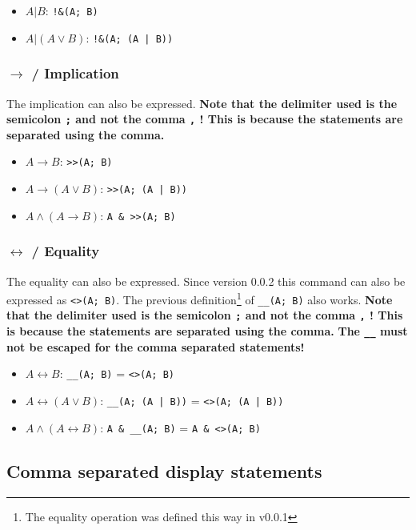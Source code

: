 \documentclass[a4paper]{article}
\begin{document}
\begin{itemize}
	\item $A | B$:  \texttt{!\&(A; B)}
	\item $A | (A \lor B)$: \texttt{!\&(A; (A | B))}
\end{itemize}

\subsubsection{$\rightarrow$ / Implication}

The implication can also be expressed. \textbf{Note that the delimiter used is the semicolon \texttt{;} and not the comma \texttt{,} ! This is because the statements are separated using the comma.}

\begin{itemize}
	\item $A \rightarrow B$:  \texttt{>>(A; B)}
	\item $A \rightarrow (A \lor B)$: \texttt{>>(A; (A | B))}
	\item $A \land (A \rightarrow B)$: \texttt{A \& >>(A; B)}
\end{itemize}

\subsubsection{$\leftrightarrow$ / Equality}

The equality can also be expressed. Since version 0.0.2 this command can also be expressed as \texttt{<>(A;~B)}. The previous definition\footnote{The equality operation was defined this way in v0.0.1} of \texttt{\_\_(A;~B)} also works. \textbf{Note that the delimiter used is the semicolon \texttt{;} and not the comma \texttt{,} ! This is because the statements are separated using the comma.} \textbf{The \texttt{\_\_} must not be escaped for the comma separated statements!}

\begin{itemize}
	\item $A \leftrightarrow B$:  \texttt{\_\_(A; B)} = \texttt{<>(A; B)}
	\item $A \leftrightarrow (A \lor B)$: \texttt{\_\_(A; (A | B))} = \texttt{<>(A; (A | B))}
	\item $A \land (A \leftrightarrow B)$: \texttt{A \& \_\_(A; B)} = \texttt{A \& <>(A; B)}
\end{itemize}

\subsection{Comma separated display statements}
\end{document}
